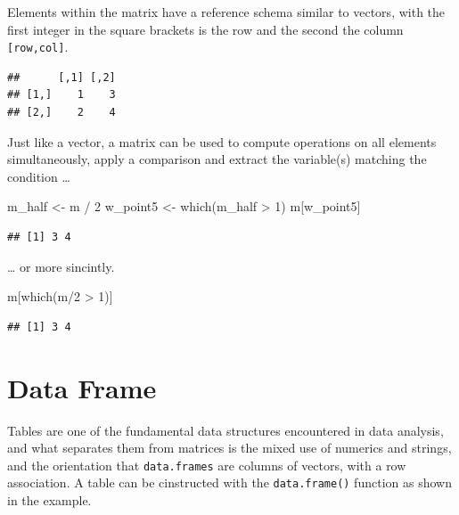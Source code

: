 \documentclass[
]{book}
\newenvironment{Shaded}{\begin{snugshade}}{\end{snugshade}}
\newcommand{\DecValTok}[1]{\textcolor[rgb]{0.00,0.00,0.81}{#1}}
\newcommand{\FunctionTok}[1]{\textcolor[rgb]{0.00,0.00,0.00}{#1}}
\newcommand{\NormalTok}[1]{#1}
\newcommand{\OtherTok}[1]{\textcolor[rgb]{0.56,0.35,0.01}{#1}}
\newcommand{\SpecialCharTok}[1]{\textcolor[rgb]{0.00,0.00,0.00}{#1}}
\begin{document}
Elements within the matrix have a reference schema similar to vectors, with the first integer in the square brackets is the row and the second the column \texttt{{[}row,col{]}}.

\begin{verbatim}
##      [,1] [,2]
## [1,]    1    3
## [2,]    2    4
\end{verbatim}

Just like a vector, a matrix can be used to compute operations on all elements simultaneously, apply a comparison and extract the variable(s) matching the condition \ldots{}

\begin{Shaded}
\begin{Highlighting}[]
\NormalTok{m\_half }\OtherTok{\textless{}{-}}\NormalTok{ m }\SpecialCharTok{/} \DecValTok{2}
\NormalTok{w\_point5 }\OtherTok{\textless{}{-}} \FunctionTok{which}\NormalTok{(m\_half }\SpecialCharTok{\textgreater{}} \DecValTok{1}\NormalTok{)}
\NormalTok{m[w\_point5]}
\end{Highlighting}
\end{Shaded}

\begin{verbatim}
## [1] 3 4
\end{verbatim}

\ldots{} or more sincintly.

\begin{Shaded}
\begin{Highlighting}[]
\NormalTok{m[}\FunctionTok{which}\NormalTok{(m}\SpecialCharTok{/}\DecValTok{2} \SpecialCharTok{\textgreater{}} \DecValTok{1}\NormalTok{)]}
\end{Highlighting}
\end{Shaded}

\begin{verbatim}
## [1] 3 4
\end{verbatim}

\hypertarget{data-frame}{%
\section{Data Frame}\label{data-frame}}

Tables are one of the fundamental data structures encountered in data analysis, and what separates them from matrices is the mixed use of numerics and strings, and the orientation that \texttt{data.frames} are columns of vectors, with a row association. A table can be cinstructed with the \texttt{data.frame()} function as shown in the example.
\end{document}
